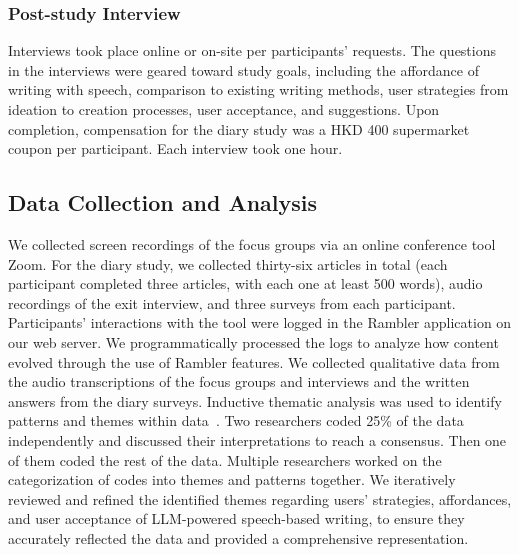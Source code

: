 \subsubsection{Post-study Interview}
Interviews took place online or on-site per participants' requests. The questions in the interviews were geared toward study goals, including the affordance of writing with speech, comparison to existing writing methods, user strategies from ideation to creation processes, user acceptance, and suggestions. Upon completion, compensation for the diary study was a HKD 400 supermarket coupon per participant. Each interview took one hour.

\subsection{Data Collection and Analysis}
We collected screen recordings of the focus groups via an online conference tool Zoom. For the diary study, we collected thirty-six articles in total (each participant completed three articles, with each one at least 500 words), audio recordings of the exit interview, and three surveys from each participant. Participants' interactions with the tool were logged in the Rambler application on our web server. We programmatically processed the logs to analyze how content evolved through the use of Rambler features.
We collected qualitative data from the audio transcriptions of the focus groups and interviews and the written answers from the diary surveys. Inductive thematic analysis was used to identify patterns and themes within data~\cite{fereday2006demonstrating}. Two researchers coded 25\% of the data independently and discussed their interpretations to reach a consensus. Then one of them coded the rest of the data. Multiple researchers worked on the categorization of codes into themes and patterns together. We iteratively reviewed and refined the identified themes regarding users' strategies, affordances, and user acceptance of LLM-powered speech-based writing, to ensure they accurately reflected the data and provided a comprehensive representation.